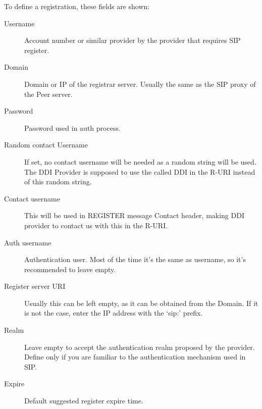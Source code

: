 \documentclass[letterpaper,10pt,spanish]{sphinxmanual}
\begin{document}
To define a registration, these fields are shown:
\begin{description}
\item[{Username}] \leavevmode{}\label{administration_portal/brand/providers/ddi_providers:term-username}
Account number or similar provider by the provider that requires SIP
register.

\item[{Domain}] \leavevmode{}\label{administration_portal/brand/providers/ddi_providers:term-domain}
Domain or IP of the registrar server. Usually the same as the SIP proxy
of the Peer server.

\item[{Password}] \leavevmode{}\label{administration_portal/brand/providers/ddi_providers:term-password}
Password used in auth process.

\item[{Random contact Username}] \leavevmode{}\label{administration_portal/brand/providers/ddi_providers:term-random-contact-username}
If set, no contact username will be needed as a random string will be used. The
DDI Provider is supposed to use the called DDI in the R-URI instead of this random string.

\item[{Contact username}] \leavevmode{}\label{administration_portal/brand/providers/ddi_providers:term-contact-username}
This will be used in REGISTER message Contact header, making DDI provider to
contact us with this in the R-URI.

\item[{Auth username}] \leavevmode{}\label{administration_portal/brand/providers/ddi_providers:term-auth-username}
Authentication user. Most of the time it's the same as username, so
it's recommended to leave empty.

\item[{Register server URI}] \leavevmode{}\label{administration_portal/brand/providers/ddi_providers:term-register-server-uri}
Usually this can be left empty, as it can be obtained from the
Domain. If it is not the case, enter the IP address with the `sip:'
prefix.

\item[{Realm}] \leavevmode{}\label{administration_portal/brand/providers/ddi_providers:term-realm}
Leave empty to accept the authentication realm proposed by the provider.
Define only if you are familiar to the authentication mechanism used
in SIP.

\item[{Expire}] \leavevmode{}\label{administration_portal/brand/providers/ddi_providers:term-expire}
Default suggested register expire time.

\end{description}
\end{document}
